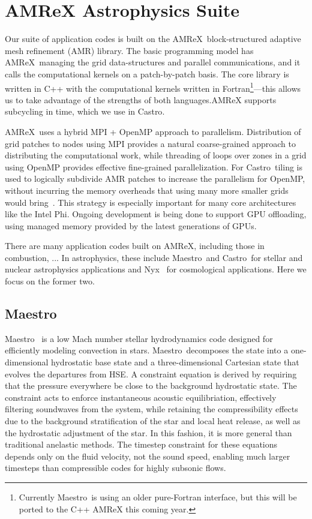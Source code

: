 \documentclass[letterpaper]{jpconf}
\newcommand{\maestro}{{\sffamily Maestro}}
\newcommand{\castro}{{\sffamily Castro}}
\newcommand{\nyx}{{\sffamily Nyx}}
\newcommand{\amrex}{{\sffamily AMReX}}
\newcommand{\MarginPar}[1]{\marginpar{\vskip-\baselineskip\raggedright\tiny\sffamily\hrule\smallskip{\color{red}#1}\par\smallskip\hrule}}
\begin{document}
\section{AMReX Astrophysics Suite}

Our suite of application codes is built on the
\amrex\ block-structured adaptive mesh refinement (AMR) library.  The
basic programming model has \amrex\ managing the grid data-structures
and parallel communications, and it calls the computational kernels on
a patch-by-patch basis.  The core library is written in C++ with the
computational kernels written in Fortran\footnote{Currently
  \maestro\ is using an older pure-Fortran interface, but this will be
  ported to the C++ AMReX this coming year.}---this allows us to take
advantage of the strengths of both languages.AMReX supports subcycling
in time, which we use in \castro.

\amrex\ uses a hybrid MPI + OpenMP approach to parallelism.
Distribution of grid patches to nodes using MPI provides a natural
coarse-grained approach to distributing the computational work, while
threading of loops over zones in a grid using OpenMP provides
effective fine-grained parallelization.  For \castro\, tiling is used
to logically subdivide AMR patches to increase the parallelism for
OpenMP, without incurring the memory overheads that using many more
smaller grids would bring~\cite{tiling}.  This strategy is especially
important for many core architectures like the Intel Phi.  Ongoing
development is being done to support GPU offloading, using managed
memory provided by the latest generations of GPUs.

There are many application codes built on \amrex, including those in
combustion, ... \MarginPar{domains?} In astrophysics, these include \maestro\ and
\castro\ for stellar and nuclear astrophysics applications and
\nyx~\cite{nyx} for cosmological applications.  Here we focus on the
former two.

\subsection{\maestro}

\maestro~\cite{MAESTRO:Multilevel} is a low Mach number stellar
hydrodynamics code designed for efficiently modeling convection in
stars.  \maestro\ decomposes the state into a one-dimensional
hydrostatic base state and a three-dimensional Cartesian state that
evolves the departures from HSE.  A constraint equation is derived by
requiring that the pressure everywhere be close to the background
hydrostatic state.  The constraint acts to enforce instantaneous
acoustic equilibriation, effectively filtering soundwaves from the
system, while retaining the compressibility effects due to the
background stratification of the star and local heat release, as well
as the hydrostatic adjustment of the star.  In this fashion, it is
more general than traditional anelastic methods.  The timestep
constraint for these equations depends only on the fluid velocity, not
the sound speed, enabling much larger timesteps than compressible
codes for highly subsonic flows.  
\end{document}
